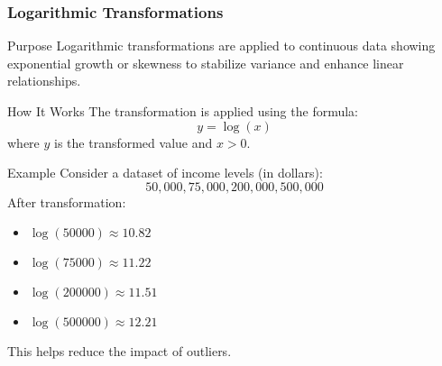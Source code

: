 \documentclass[aspectratio=169]{beamer}
\begin{document}
\begin{frame}[fragile]
    \frametitle{Logarithmic Transformations}
    \begin{block}{Purpose}
        Logarithmic transformations are applied to continuous data showing exponential growth or skewness to stabilize variance and enhance linear relationships.
    \end{block}

    \begin{block}{How It Works}
        The transformation is applied using the formula:
        \[
        y = \log(x)
        \]
        where \( y \) is the transformed value and \( x > 0 \).
    \end{block}

    \begin{block}{Example}
        Consider a dataset of income levels (in dollars):  
        \[ 50,000, 75,000, 200,000, 500,000 \]
        After transformation:
        \begin{itemize}
            \item \( \log(50000) \approx 10.82 \)
            \item \( \log(75000) \approx 11.22 \)
            \item \( \log(200000) \approx 11.51 \)
            \item \( \log(500000) \approx 12.21 \)
        \end{itemize}
        This helps reduce the impact of outliers.
    \end{block}
\end{frame}
\end{document}
